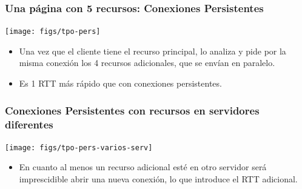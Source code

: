 \documentclass[hyperref={pdfpagelabels=true},ucs]{beamer}
\begin{document}

\begin{frame}[shrink=10]
\frametitle{Una página con 5 recursos: Conexiones Persistentes}

\begin{center}
\texttt{[image: figs/tpo-pers]}
\end{center}

\begin{itemize}
\item Una vez que el cliente tiene el recurso principal, lo analiza y
  pide por la misma conexión los 4 recursos adicionales, que se envían
  en paralelo.
\item Es 1 RTT más rápido que con conexiones persistentes.
\end{itemize}


\end{frame}



\begin{frame}[shrink=10]
\frametitle{Conexiones Persistentes con recursos en servidores diferentes} 

\begin{center}
\texttt{[image: figs/tpo-pers-varios-serv]}
\end{center}

\begin{itemize}
\item En cuanto al menos un recurso adicional esté en otro servidor
  será imprescidible abrir una nueva conexión, lo que introduce el RTT
  adicional.
\end{itemize}


\end{frame}





\end{document}
